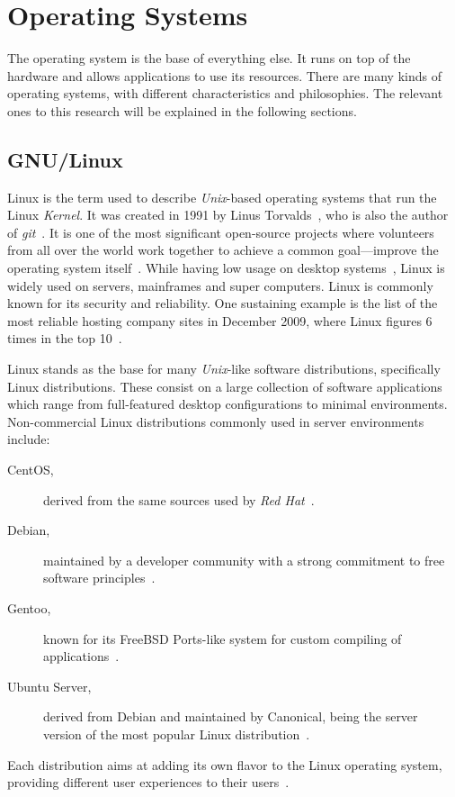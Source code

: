 \section{Operating Systems}
\label{tech:sec:operating_systems}
The operating system is the base of everything else. It runs on top of the hardware and allows applications to use its resources. There are many kinds of operating systems, with different characteristics and philosophies. The relevant ones to this research will be explained in the following sections.

\subsection{GNU/Linux}
Linux is the term used to describe \textit{Unix}-based operating systems that run the Linux \textit{Kernel}. It was created in 1991 by Linus Torvalds~\cite{linux_kernel_evolution}, who is also the author of \textit{git}~\cite{pro_git}. It is one of the most significant open-source projects where volunteers from all over the world work together to achieve a common goal---improve the operating system itself~\cite{linux_kernel_evolution}. While having low usage on desktop systems~\cite{w3counter}, Linux is widely used on servers, mainframes and super computers. Linux is commonly known for its security and reliability. One sustaining example is the list of the most reliable hosting company sites in December 2009, where Linux figures 6 times in the top 10~\cite{netcraft_dec2009}.

Linux stands as the base for many \textit{Unix}-like software distributions, specifically Linux distributions. These consist on a large collection of software applications which range from full-featured desktop configurations to minimal environments. Non-commercial Linux distributions commonly used in server environments include:
\begin {description}
\item[CentOS,] derived from the same sources used by \textit{Red Hat}~\cite{centos}.
\item[Debian,] maintained by a developer community with a strong commitment to free software principles~\cite{debian}.
\item[Gentoo,] known for its FreeBSD Ports-like system for custom compiling of applications~\cite{gentoo}.
\item[Ubuntu Server,] derived from Debian and maintained by Canonical, being the server version of the most popular Linux distribution~\cite{ubuntu_server}.
\end{description}
Each distribution aims at adding its own flavor to the Linux operating system, providing different user experiences to their users~\cite{tuning_costumizing_linux}.


